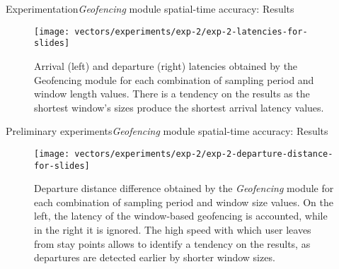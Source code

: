 \begin{frame}[noframenumbering]{Experimentation}{\emph{Geofencing} module spatial-time accuracy: Results}
\vspace{-0.5cm}
\begin{figure}
  \centering
  \texttt{[image: vectors/experiments/exp-2/exp-2-latencies-for-slides]}
  \caption{Arrival (left) and departure (right) latencies obtained by the Geofencing  module for each combination of sampling period and window length values. There is a tendency on the results as the shortest window’s sizes produce the shortest arrival latency values.}
\end{figure}
\end{frame}

\begin{frame}[noframenumbering]{Preliminary experiments}{\emph{Geofencing} module spatial-time accuracy: Results}
\vspace{-0.5cm}
\begin{figure}
  \centering
  \texttt{[image: vectors/experiments/exp-2/exp-2-departure-distance-for-slides]}
  \caption{Departure distance difference obtained by the \emph{Geofencing} module for each combination of sampling period and window size values. On the left, the latency of the window-based geofencing is accounted, while in the right it is ignored. The high speed with which user leaves from stay points allows to identify a tendency on the results, as departures are detected earlier by shorter window sizes.}
\end{figure}
\end{frame}


